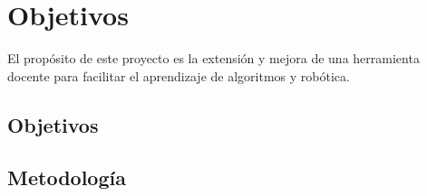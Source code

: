 \chapter{Objetivos}

El propósito de este proyecto es la extensión y mejora de una herramienta docente para facilitar el aprendizaje de algoritmos y robótica. 
\label{chap:objetivos}
\section{Objetivos}


\section{Metodología}
